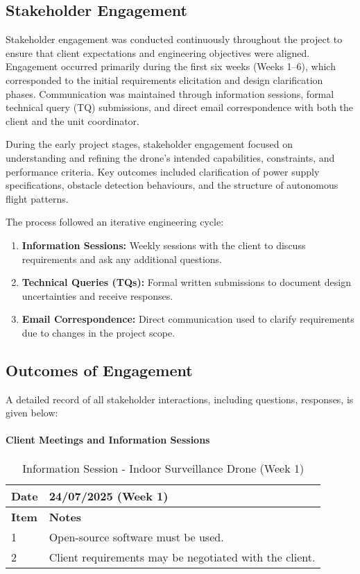 \subsection{Stakeholder Engagement}
Stakeholder engagement was conducted continuously throughout the project to ensure that client expectations and engineering objectives were aligned. Engagement occurred primarily during the first six weeks (Weeks 1–6), which corresponded to the initial requirements elicitation and design clarification phases. Communication was maintained through information sessions, formal technical query (TQ) submissions, and direct email correspondence with both the client and the unit coordinator.

During the early project stages, stakeholder engagement focused on understanding and refining the drone’s intended capabilities, constraints, and performance criteria. Key outcomes included clarification of power supply specifications, obstacle detection behaviours, and the structure of autonomous flight patterns. 

The process followed an iterative engineering cycle:
\begin{enumerate}
    \item \textbf{Information Sessions:} Weekly sessions with the client to discuss requirements and ask any additional questions.
    \item \textbf{Technical Queries (TQs):} Formal written submissions to document design uncertainties and receive responses.
    \item \textbf{Email Correspondence:} Direct communication used to clarify requirements due to changes in the project scope.
\end{enumerate}

\subsection{Outcomes of Engagement}

A detailed record of all stakeholder interactions, including questions, responses, is given below:

\paragraph{\textbf{Client Meetings and Information Sessions}} \leavevmode

\begin{table}[H]
\centering
\caption{Information Session - Indoor Surveillance Drone (Week 1)}
\begin{tabular}{|l|p{10cm}|}
\hline
\textbf{Date} & 24/07/2025 (Week 1) \\ \hline
\textbf{Item} & \textbf{Notes} \\ \hline
1 & Open-source software must be used. \\ \hline
2 & Client requirements may be negotiated with the client. \\ \hline
\end{tabular}
\end{table}

